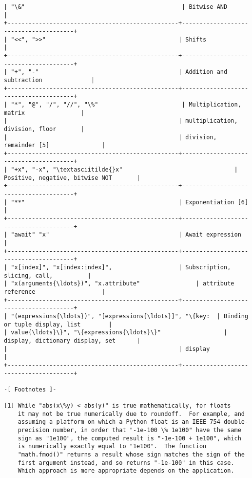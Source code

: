 \documentclass[11pt]{article}
\begin{document}
\begin{Verbatim}[commandchars=\\\{\}]
| "\&"                                             | Bitwise AND                           |
+-------------------------------------------------+---------------------------------------+
| "<<", ">>"                                      | Shifts                                |
+-------------------------------------------------+---------------------------------------+
| "+", "-"                                        | Addition and subtraction              |
+-------------------------------------------------+---------------------------------------+
| "*", "@", "/", "//", "\%"                        | Multiplication, matrix                |
|                                                 | multiplication, division, floor       |
|                                                 | division, remainder [5]               |
+-------------------------------------------------+---------------------------------------+
| "+x", "-x", "\textasciitilde{}x"                                | Positive, negative, bitwise NOT       |
+-------------------------------------------------+---------------------------------------+
| "**"                                            | Exponentiation [6]                    |
+-------------------------------------------------+---------------------------------------+
| "await" "x"                                     | Await expression                      |
+-------------------------------------------------+---------------------------------------+
| "x[index]", "x[index:index]",                   | Subscription, slicing, call,          |
| "x(arguments{\ldots})", "x.attribute"                | attribute reference                   |
+-------------------------------------------------+---------------------------------------+
| "(expressions{\ldots})", "[expressions{\ldots}]", "\{key:  | Binding or tuple display, list        |
| value{\ldots}\}", "\{expressions{\ldots}\}"                  | display, dictionary display, set      |
|                                                 | display                               |
+-------------------------------------------------+---------------------------------------+

-[ Footnotes ]-

[1] While "abs(x\%y) < abs(y)" is true mathematically, for floats
    it may not be true numerically due to roundoff.  For example, and
    assuming a platform on which a Python float is an IEEE 754 double-
    precision number, in order that "-1e-100 \% 1e100" have the same
    sign as "1e100", the computed result is "-1e-100 + 1e100", which
    is numerically exactly equal to "1e100".  The function
    "math.fmod()" returns a result whose sign matches the sign of the
    first argument instead, and so returns "-1e-100" in this case.
    Which approach is more appropriate depends on the application.


\end{Verbatim}
\end{document}
